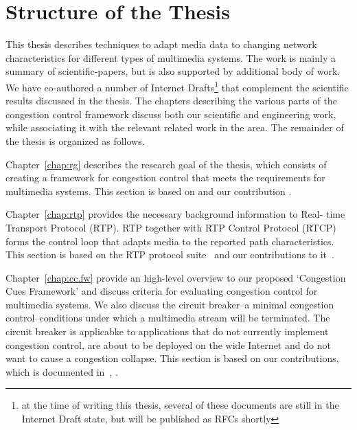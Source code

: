 \section{Structure of the Thesis}

This thesis describes techniques to adapt media data to changing network
characteristics for different types of multimedia systems. The work is mainly
a summary of scientific-papers, but is also supported by additional body of
work. We have co-authored a number of Internet Drafts\footnote{at the time of
writing this thesis, several of these documents are still in the Internet
Draft state, but will be published as RFCs shortly} that complement the
scientific results discussed in the thesis. The chapters describing the
various parts of the congestion control framework discuss both our scientific
and engineering work, while associating it with the relevant related work in
the area. The remainder of the thesis is organized as follows.

Chapter~\ref{chap:rg} describes the research goal of the thesis, which
consists of creating a framework for congestion control that meets the
requirements for multimedia systems. This section is based on
\cite{draft.rmcat.req} and our contribution \cite{Singh:control.loops.api}.


Chapter~\ref{chap:rtp} provides the necessary background information to Real-
time Transport Protocol (RTP). RTP together with RTP Control Protocol (RTCP)
forms the control loop that adapts media to the reported path characteristics.
This section is based on the RTP protocol suite~\cite{rfc3550, rfc4585,
rfc3611, rfc5104, rfc5506} and our contributions to
it~\cite{draft.xr.discard.rle, draft.xr.jb}.


Chapter~\ref{chap:cc.fw} provide an high-level overview to our proposed
`Congestion Cues Framework' and discuss criteria for evaluating congestion
control for multimedia systems. We also discuss the circuit breaker--a minimal
congestion control--conditions under which a multimedia stream will be
terminated. The circuit breaker is applicabke to applications that do not
currently implement congestion control, are about to be deployed on the wide
Internet and do not want to cause a congestion collapse. This section is based
on our contributions, which is documented in~\cite{draft.rmcat.evaluate,
Singh:PhDFw, draft.rtp.cb}, .


